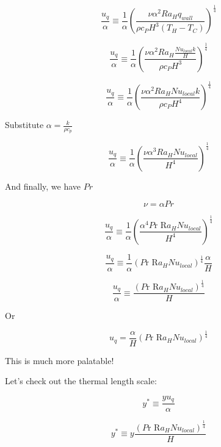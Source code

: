 \documentclass[12pt]{article}
\renewcommand{\_}{\kern-1.5pt\textunderscore\kern-1.5pt}
\begin{document}
 \[ \frac{u_{q}}{ \alpha } \equiv \frac{1}{ \alpha } \left( \frac{ \nu  \alpha ^{2}Ra_{H}q_{wall}}{ \rho c_{P}H^{3} \left( T_{H}-T_{C} \right) } \right) ^{\frac{1}{4}} \] \par

 \[ \frac{u_{q}}{ \alpha } \equiv \frac{1}{ \alpha } \left( \frac{ \nu  \alpha ^{2}Ra_{H}\frac{Nu_{local}k}{H}}{ \rho c_{P}H^{3}} \right) ^{\frac{1}{4}} \] \par

 \[ \frac{u_{q}}{ \alpha } \equiv \frac{1}{ \alpha } \left( \frac{ \nu  \alpha ^{2}Ra_{H}Nu_{local}k}{ \rho c_{P}H^{4}} \right) ^{\frac{1}{4}} \] \par

Substitute  \(  \alpha =\frac{k}{ \rho c_{p}} \) \par

 \[ \frac{u_{q}}{ \alpha } \equiv \frac{1}{ \alpha } \left( \frac{ \nu  \alpha ^{3}Ra_{H}Nu_{local}}{H^{4}} \right) ^{\frac{1}{4}} \] \par

And finally, we have  \( Pr \) \par

 \[  \nu = \alpha Pr \] \par

 \[ \frac{u_{q}}{ \alpha } \equiv \frac{1}{ \alpha } \left( \frac{ \alpha ^{4}P\text{r R}a_{H}Nu_{local}}{H^{4}} \right) ^{\frac{1}{4}} \] \par

 \[ \frac{u_{q}}{ \alpha } \equiv \frac{1}{ \alpha } \left( P\text{r R}a_{H}Nu_{local} \right) ^{\frac{1}{4}}\frac{ \alpha }{H} \] \par

 \[ \frac{u_{q}}{ \alpha } \equiv \frac{ \left( P\text{r R}a_{H}Nu_{local} \right) ^{\frac{1}{4}}}{H} \] \par

Or \par

 \[ u_{q}=\frac{ \alpha }{H} \left( P\text{r R}a_{H}Nu_{local} \right) ^{\frac{1}{4}} \] \par

This is much more palatable!\par

Let’s check out the thermal length scale:\par

 \[ y^{\ast} \equiv \frac{yu_{q}}{ \alpha } \] \par

 \[ y^{\ast} \equiv y\frac{ \left( P\text{r R}a_{H}Nu_{local} \right) ^{\frac{1}{4}}}{H} \] \par
\end{document}
